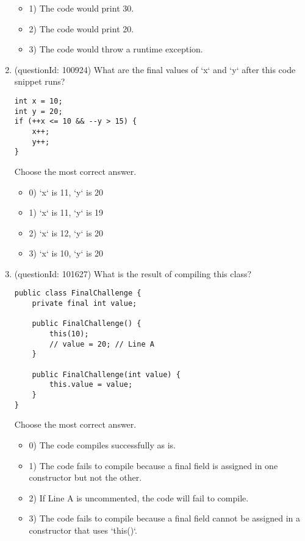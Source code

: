 \documentclass[12pt]{article}
\begin{document}
\begin{enumerate}[label=(\arabic*)]
\begin{itemize}
\item 1) The code would print 30.

\item 2) The code would print 20.

\item 3) The code would throw a runtime exception.

\end{itemize}
\item (questionId: 100924) What are the final values of `x` and `y` after this code snippet runs?\n\begin{verbatim}
int x = 10;
int y = 20;
if (++x <= 10 && --y > 15) {
    x++;
    y++;
}
\end{verbatim}
Choose the most correct answer. 
\begin{itemize}
\item 0) `x` is 11, `y` is 20

\item 1) `x` is 11, `y` is 19

\item 2) `x` is 12, `y` is 20

\item 3) `x` is 10, `y` is 20

\end{itemize}
\item (questionId: 101627) What is the result of compiling this class? \n\begin{verbatim}
public class FinalChallenge {
    private final int value;

    public FinalChallenge() {
        this(10);
        // value = 20; // Line A
    }

    public FinalChallenge(int value) {
        this.value = value;
    }
}
\end{verbatim}
Choose the most correct answer. 
\begin{itemize}
\item 0) The code compiles successfully as is.

\item 1) The code fails to compile because a final field is assigned in one constructor but not the other.

\item 2) If Line A is uncommented, the code will fail to compile.

\item 3) The code fails to compile because a final field cannot be assigned in a constructor that uses `this()`.


\end{itemize}
\end{enumerate}
\end{document}
